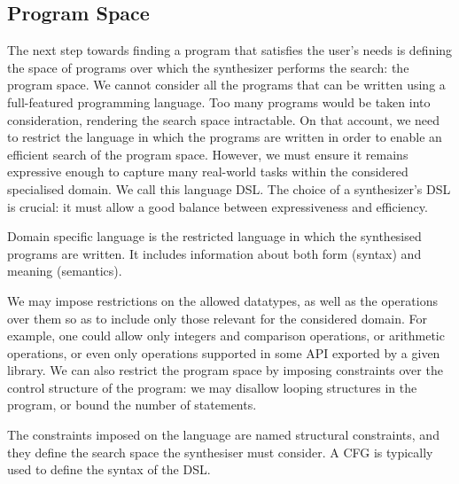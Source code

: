 \subsection{Program Space} \label{sec:program-space}
The next step towards finding a program that satisfies the user's needs is defining the space of programs over which the synthesizer performs the search: the program space.
We cannot consider all the programs that can be written using a full-featured programming language. Too many programs would be taken into consideration, rendering the search space intractable.
On that account, we need to restrict the language in which the programs are written in order to enable an efficient search of the program space.
However, we must ensure it remains expressive enough to capture many real-world tasks within the considered specialised domain.
We call this language \acf{DSL}.
The choice of a synthesizer's \ac{DSL} is crucial: it must allow a good balance between expressiveness and efficiency.

\begin{definition}
Domain specific language is the restricted language in which the synthesised programs are written. It includes information about both form (syntax) and meaning (semantics).
\end{definition}

\noindent
We may impose restrictions on the allowed datatypes, as well as the operations over them so as to include only those relevant for the considered domain. For example, one could allow only integers and comparison operations, or arithmetic operations, or even only operations supported in some API exported by a given library. We can also restrict the program space by imposing constraints over the control structure of the program: we may disallow looping structures in the program, or bound the number of statements.

The constraints imposed on the language are named structural constraints, and they define the search space the synthesiser must consider. A \ac{CFG} is typically used to define the syntax of the \ac{DSL}.

